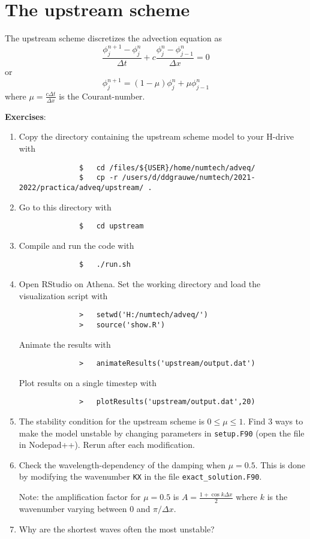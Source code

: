\documentclass[a4paper]{article}
\begin{document}
\section{The upstream scheme}
%
\par
The upstream scheme discretizes the advection equation as
%
\begin{equation*}
	\frac{\phi^{n+1}_{j}-\phi^{n}_{j}}{\Delta t}+c\frac{\phi^{n}_{j}-\phi^{n}_{j-1}}{\Delta x}=0
\end{equation*}
%
or
%
\begin{equation*}
	\phi^{n+1}_{j}=(1-\mu)\phi^{n}_{j}+\mu\phi^{n}_{j-1}
\end{equation*}
%
where $\mu=\frac{c\Delta t}{\Delta x}$ is the Courant-number.
%
\par\vspace*{3ex}\clearpage
\textbf{Exercises}:
%
\begin{enumerate}
	\item Copy the directory containing the upstream scheme model to your H-drive with
		\begin{verbatim}
			  $   cd /files/${USER}/home/numtech/adveq/
			  $   cp -r /users/d/ddgrauwe/numtech/2021-2022/practica/adveq/upstream/ .
		\end{verbatim}
	\item Go to this directory with
		\begin{verbatim}
			  $   cd upstream
		\end{verbatim}
	\item Compile and run the code with
		\begin{verbatim}
			  $   ./run.sh
		\end{verbatim}
	\item Open RStudio on Athena. Set the working directory and load the visualization script with
		\begin{verbatim}
			  >   setwd('H:/numtech/adveq/')
			  >   source('show.R')
		\end{verbatim}
		Animate the results with
		\begin{verbatim}
			  >   animateResults('upstream/output.dat')
		\end{verbatim}
		Plot results on a single timestep with
		\begin{verbatim}
			  >   plotResults('upstream/output.dat',20)
		\end{verbatim}
	\item The stability condition for the upstream scheme is $0\leq\mu\leq1$. Find 3 ways to make the model unstable by changing parameters in \verb+setup.F90+ (open the file in Nodepad++). Rerun after each modification.
	\item Check the wavelength-dependency of the damping when $\mu=0.5$. This is done by modifying the wavenumber \verb+KX+ in the file \verb+exact_solution.F90+.
		\par
		Note: the amplification factor for $\mu=0.5$ is $A=\frac{1+\cos k\Delta x}{2}$ where $k$ is the wavenumber varying between 0 and $\pi/\Delta x$.
	\item Why are the shortest waves often the most unstable?
\end{enumerate}
%
\end{document}
